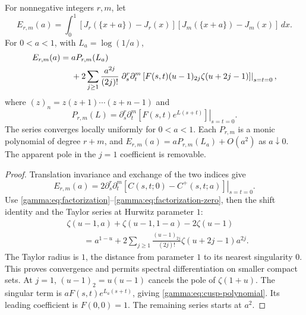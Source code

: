 \begin{theorem}
\label{gamma:thm:jet-cusp}
For nonnegative integers $r,m$, let
\begin{equation}
 E_{r,m}(a)=\int_0^1[J_r(\{x+a\})-J_r(x)]
                       [J_m(\{x+a\})-J_m(x)]\,dx.
 \label{gamma:eq:mixed-increments}
\end{equation}
For $0<a<1$, with $L_a=\log(1/a)$,
\begin{align}
 E_{r,m}(a)
 ={}&aP_{r,m}(L_a)\notag\\
 &+2\sum_{j\ge1}\frac{a^{2j}}{(2j)!}
 \left.\partial_s^r\partial_t^m
 \left[F(s,t)(u-1)_{2j}\zeta(u+2j-1)\right]\right|_{s=t=0},
 \label{gamma:eq:all-jet-expansion}
\end{align}
where $(z)_n=z(z+1)\cdots(z+n-1)$ and
\begin{equation}
 P_{r,m}(L)=
 \left.\partial_s^r\partial_t^m
              [F(s,t)e^{L(s+t)}]\right|_{s=t=0}.
 \label{gamma:eq:cusp-polynomial}
\end{equation}
The series converges locally uniformly for $0<a<1$. Each
$P_{r,m}$ is a monic polynomial of degree $r+m$, and
$E_{r,m}(a)=aP_{r,m}(L_a)+O(a^2)$ as $a\downarrow0$.
The apparent pole in the $j=1$ coefficient is removable.
\end{theorem}

\begin{proof}
Translation invariance and exchange of the two indices give
\[
 E_{r,m}(a)=
 2\left.\partial_s^r\partial_t^m
     [C(s,t;0)-C^+(s,t;a)]\right|_{s=t=0}.
\]
Use \eqref{gamma:eq:factorization}--\eqref{gamma:eq:factorization-zero},
then the shift identity and the Taylor series at Hurwitz parameter $1$:
\begin{align*}
 &\zeta(u-1,a)+\zeta(u-1,1-a)-2\zeta(u-1)\\
 &\qquad=a^{1-u}
     +2\sum_{j\ge1}\frac{(u-1)_{2j}}{(2j)!}
                         \zeta(u+2j-1)a^{2j}.
\end{align*}
The Taylor radius is $1$, the distance from parameter $1$ to its
nearest singularity $0$. This proves convergence and permits spectral
differentiation on smaller compact sets. At $j=1$,
$(u-1)_2=u(u-1)$ cancels the pole of $\zeta(1+u)$.
The singular term is $aF(s,t)e^{L_a(s+t)}$, giving
\eqref{gamma:eq:cusp-polynomial}. Its leading coefficient is
$F(0,0)=1$. The remaining series starts at $a^2$.
\end{proof}

